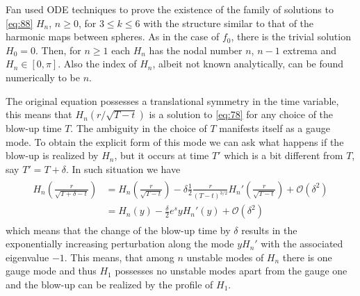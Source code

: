 Fan \cite{Fan1999} used ODE techniques to prove the existence of the
family of solutions to \eqref{eq:88} $H_n$, $n\ge0$, for $3\le k\le6$
with the structure similar to that of the harmonic maps between
spheres. As in the case of $f_0$, there is the trivial solution
$H_0=0$. Then, for $n\ge1$ each $H_n$ has the nodal number $n$, $n-1$
extrema and $H_n\in[0,\pi]$. Also the index of $H_n$, albeit not known
analytically, can be found numerically to be $n$.


The original equation possesses a translational symmetry in the time
variable, this means that $H_n(r/\sqrt{T-t})$ is a solution to
\eqref{eq:78} for any choice of the blow-up time $T$. The ambiguity in
the choice of $T$ manifests itself as a gauge mode. To obtain the
explicit form of this mode we can ask what happens if the blow-up is
realized by $H_n$, but it occurs at time $T'$ which is a bit different
from $T$, say $T'=T+\delta$. In such situation we have
\begin{align}
  \label{eq:92}
  \begin{split}
    H_n\left(\frac{r}{\sqrt{T+\delta-t}}\right)
    &=H_n\left(\frac{r}{\sqrt{T-t}}\right)
    -\delta\frac{1}{2}\frac{r}{(T-t)^{3/2}}H_n'\left(\frac{r}{\sqrt{T-t}}\right)
    +\mathcal{O}(\delta^2)\\
    &=H_n(y)-\frac{\delta}{2} e^{s} yH_n'(y)+\mathcal{O}(\delta^2)
  \end{split}
\end{align}
which means that the change of the blow-up time by $\delta$ results in
the exponentially increasing perturbation along the mode $yH_n'$ with
the associated eigenvalue $-1$. This means, that among $n$ unstable
modes of $H_n$ there is one gauge mode and thus $H_1$ possesses no
unstable modes apart from the gauge one and the blow-up can be
realized by the profile of $H_1$.





